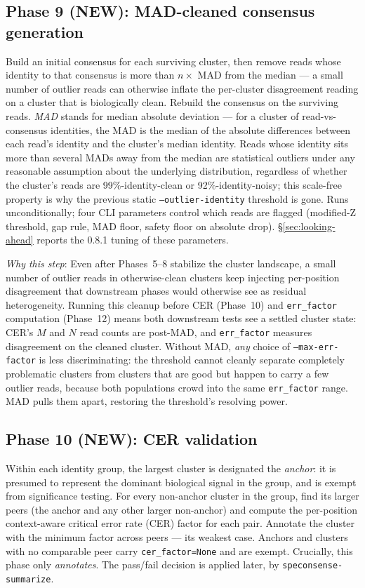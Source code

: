\documentclass[11pt]{article}
\begin{document}
\subsection*{Phase 9 (NEW): MAD-cleaned consensus generation}

Build an initial consensus for each surviving cluster, then remove reads
whose identity to that consensus is more than $n \times$ MAD from the
median --- a small number of outlier reads can otherwise inflate
the per-cluster disagreement reading on a cluster that is biologically
clean. Rebuild the consensus on the surviving reads. \emph{MAD} stands
for median absolute deviation --- for a cluster of read-vs-consensus
identities, the MAD is the median of the absolute differences between
each read's identity and the cluster's median identity. Reads whose
identity sits more than several MADs away from the median are
statistical outliers under any reasonable assumption about the
underlying distribution, regardless of whether the cluster's reads
are 99\%-identity-clean or 92\%-identity-noisy; this scale-free
property is why the previous static \texttt{--outlier-identity}
threshold is gone. Runs unconditionally; four CLI parameters
control which reads are flagged (modified-Z threshold, gap rule, MAD
floor, safety floor on absolute drop). §\ref{sec:looking-ahead}
reports the 0.8.1 tuning of these parameters.

\emph{Why this step}: Even after Phases~5--8 stabilize the cluster
landscape, a small number of outlier reads in otherwise-clean clusters
keep injecting per-position disagreement that downstream phases would
otherwise see as residual heterogeneity. Running this cleanup before
CER (Phase~10) and \texttt{err\_factor} computation (Phase~12) means
both downstream tests see a settled cluster state: CER's $M$ and $N$
read counts are post-MAD, and \texttt{err\_factor} measures
disagreement on the cleaned cluster. Without MAD, \emph{any} choice
of \texttt{--max-err-factor} is less discriminating: the threshold
cannot cleanly separate completely problematic clusters from clusters
that are good but happen to carry a few outlier reads, because both
populations crowd into the same \texttt{err\_factor} range. MAD pulls
them apart, restoring the threshold's resolving power.

\subsection*{Phase 10 (NEW): CER validation}

Within each identity group, the largest cluster is designated the
\emph{anchor}: it is presumed to represent the dominant biological signal in
the group, and is exempt from significance testing. For every non-anchor
cluster in the group, find its larger peers (the anchor and any other
larger non-anchor) and compute the per-position context-aware critical
error rate (CER) factor for each pair. Annotate the cluster with the
minimum factor across peers --- its weakest case. Anchors and clusters with
no comparable peer carry \texttt{cer\_factor=None} and are exempt.
Crucially, this phase only \emph{annotates}. The pass/fail decision is
applied later, by \texttt{speconsense-summarize}.
\end{document}
